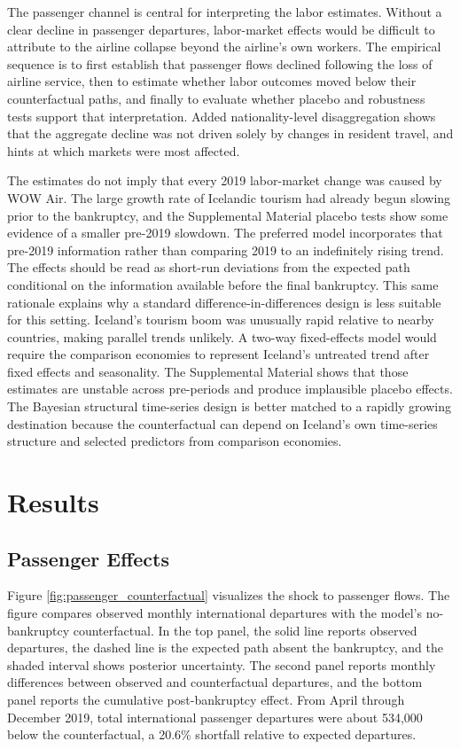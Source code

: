 \documentclass[12pt]{article}
\begin{document}
The passenger channel is central for interpreting the labor estimates. Without a clear decline in passenger departures, labor-market effects would be difficult to attribute to the airline collapse beyond the airline's own workers. The empirical sequence is to first establish that passenger flows declined following the loss of airline service, then to estimate whether labor outcomes moved below their counterfactual paths, and finally to evaluate whether placebo and robustness tests support that interpretation. Added nationality-level disaggregation shows that the aggregate decline was not driven solely by changes in resident travel, and hints at which markets were most affected.

The estimates do not imply that every 2019 labor-market change was caused by WOW Air. The large growth rate of Icelandic tourism had already begun slowing prior to the bankruptcy, and the Supplemental Material placebo tests show some evidence of a smaller pre-2019 slowdown. The preferred model incorporates that pre-2019 information rather than comparing 2019 to an indefinitely rising trend. The effects should be read as short-run deviations from the expected path conditional on the information available before the final bankruptcy. This same rationale explains why a standard difference-in-differences design is less suitable for this setting. Iceland's tourism boom was unusually rapid relative to nearby countries, making parallel trends unlikely. A two-way fixed-effects model would require the comparison economies to represent Iceland's untreated trend after fixed effects and seasonality. The Supplemental Material shows that those estimates are unstable across pre-periods and produce implausible placebo effects. The Bayesian structural time-series design is better matched to a rapidly growing destination because the counterfactual can depend on Iceland's own time-series structure and selected predictors from comparison economies.

\section{Results}\label{sec:results}

\subsection{Passenger Effects}\label{sec:passenger_access}

Figure \ref{fig:passenger_counterfactual} visualizes the shock to passenger flows. The figure compares observed monthly international departures with the model's no-bankruptcy counterfactual. In the top panel, the solid line reports observed departures, the dashed line is the expected path absent the bankruptcy, and the shaded interval shows posterior uncertainty. The second panel reports monthly differences between observed and counterfactual departures, and the bottom panel reports the cumulative post-bankruptcy effect. From April through December 2019, total international passenger departures were about 534,000 below the counterfactual, a 20.6\% shortfall relative to expected departures.
\end{document}
